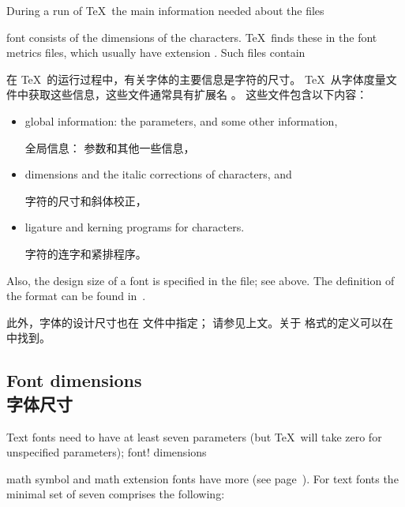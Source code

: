 During a run of \TeX\ the main information needed about the
\term {} files\par
font consists of the dimensions of the characters.
\TeX\ finds these in the font metrics files, which usually have
extension . Such files
contain 

在 \TeX\ 的运行过程中，有关字体的主要信息是字符的尺寸。
\TeX\ 从字体度量文件中获取这些信息，这些文件通常具有扩展名 。
这些文件包含以下内容：
\begin{itemize} \item global information: the 
parameters, and some other information,

全局信息： 参数和其他一些信息，
\item dimensions and the italic corrections of characters, and
\altt 

字符的尺寸和斜体校正，
\item ligature and kerning programs for characters.

字符的连字和紧排程序。
	\end{itemize}
Also, the design size of a font is specified in the  file;
see above. The definition of the  format can be found
in~\cite{Knuth:TeXprogram}.

此外，字体的设计尺寸也在  文件中指定；
请参见上文。关于  格式的定义可以在~\cite{Knuth:TeXprogram} 中找到。


\subsection{Font dimensions\\字体尺寸}
\label{font:dims}

Text fonts need to have at least seven  parameters
(but \TeX\ will take zero for unspecified parameters);
\term font! dimensions\par
math symbol and math extension fonts have more
(see page~\pageref{fam23:fontdims}).
For text fonts the minimal set of seven comprises the following:


